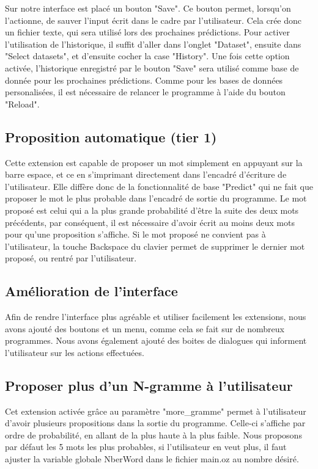 \documentclass{article}
\begin{document}
Sur notre interface est placé un bouton "Save". Ce bouton permet, lorsqu'on l'actionne, de sauver l'input écrit dans le cadre par l'utilisateur. Cela crée donc un fichier texte, qui sera utilisé lors des prochaines prédictions. Pour activer l'utilisation de l'historique, il suffit d'aller dans l'onglet "Dataset", ensuite dans "Select datasets", et d'ensuite cocher la case "History". Une fois cette option activée, l'historique enregistré par le bouton "Save" sera utilisé comme base de donnée pour les prochaines prédictions. Comme pour les bases de données personalisées, il est nécessaire de relancer le programme à l'aide du bouton "Reload".

\subsection{Proposition automatique (tier 1)}

Cette extension est capable de proposer un mot simplement en appuyant sur la barre espace, et ce en s'imprimant directement dans l'encadré d'écriture de l'utilisateur. Elle diffère donc de la fonctionnalité de base "Predict" qui ne fait que proposer le mot le plus probable dans l'encadré de sortie du programme. Le mot proposé est celui qui a la plus grande probabilité d'être la suite des deux mots précédents, par conséquent, il est nécessaire d'avoir écrit au moins deux mots pour qu'une proposition s'affiche. Si le mot proposé ne convient pas à l'utilisateur, la touche Backspace du clavier permet de supprimer le dernier mot proposé, ou rentré par l'utilisateur.

\subsection{Amélioration de l'interface}

Afin de rendre l'interface plus agréable et utiliser facilement les extensions, nous avons ajouté des boutons et un menu, comme cela se fait sur de nombreux programmes. Nous avons également ajouté des boites de dialogues qui informent l'utilisateur sur les actions effectuées.

\subsection{Proposer plus d’un N-gramme à l’utilisateur}
Cet extension activée grâce au paramètre "more\_gramme" permet à l'utilisateur d'avoir plusieurs propositions dans la sortie du programme. Celle-ci s'affiche par ordre de probabilité, en allant de la plus haute à la plus faible. Nous proposons par défaut les 5 mots les plus probables, si l'utilisateur en veut plus, il faut ajuster la variable globale NberWord dans le fichier main.oz au nombre désiré.
\end{document}
